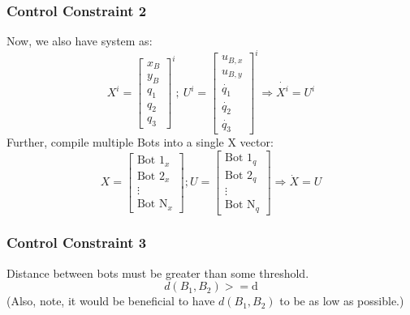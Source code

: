\documentclass[12pt,english]{report}
\begin{document}
\subsubsection*{Control Constraint 2}
Now, we also have system as: 
\begin{equation}
    X^i = 
    \begin{bmatrix}
        x_B\\
        y_B\\
        q_1\\
        q_2\\
        q_3
    \end{bmatrix}^i
    ; \ U^i = 
    \begin{bmatrix}
        u_{B,x}\\
        u_{B,y}\\
        \dot{q_1}\\
        \dot{q_2}\\
        \dot{q_3}
    \end{bmatrix}^i \Longrightarrow \dot{X^i}=U^i
\end{equation}
Further, compile multiple Bots into a single X vector:
\[
    X = \begin{bmatrix}
        \text{Bot 1}_x\\
        \text{Bot 2}_x\\
        \vdots\\
        \text{Bot N}_x
    \end{bmatrix} ; U =\begin{bmatrix}
        \text{Bot 1}_q\\
        \text{Bot 2}_q\\
        \vdots\\
        \text{Bot N}_q
    \end{bmatrix} \Longrightarrow \dot{X}=U
\]
\subsubsection*{Control Constraint 3}
Distance between bots must be greater than some threshold.
\begin{equation}
    d(B_1, B_2) >= \text{d}
\end{equation}
(Also, note, it would be beneficial to have $d(B_1, B_2)$ to be as low as possible.)
\end{document}
